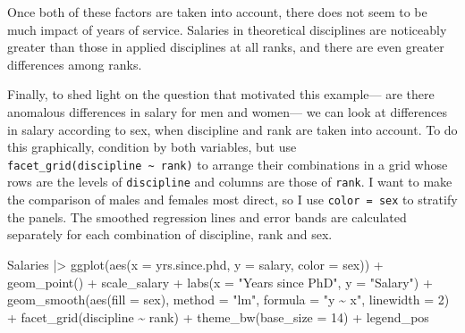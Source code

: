 \documentclass[
  letterpaper,
  10pt,
  krantz2]{krantz}
\makeatletter
\newenvironment{Shaded}{\begin{snugshade}}{\end{snugshade}}
\newcommand{\AttributeTok}[1]{\textcolor[rgb]{0.40,0.45,0.13}{#1}}
\newcommand{\DecValTok}[1]{\textcolor[rgb]{0.68,0.00,0.00}{#1}}
\newcommand{\FunctionTok}[1]{\textcolor[rgb]{0.28,0.35,0.67}{#1}}
\newcommand{\NormalTok}[1]{\textcolor[rgb]{0.00,0.23,0.31}{#1}}
\newcommand{\SpecialCharTok}[1]{\textcolor[rgb]{0.37,0.37,0.37}{#1}}
\newcommand{\StringTok}[1]{\textcolor[rgb]{0.13,0.47,0.30}{#1}}
\newenvironment{kframe}{%
  \medskip{}
  \setlength{\fboxsep}{.8em}
  \def\at@end@of@kframe{}%
  \ifinner\ifhmode%
  \def\at@end@of@kframe{\end{minipage}}%
  \begin{minipage}{\columnwidth}%
  \fi\fi%
  \def\FrameCommand##1{\hskip\@totalleftmargin \hskip-\fboxsep
  \colorbox{shadecolor}{##1}\hskip-\fboxsep
      \hskip-\linewidth \hskip-\@totalleftmargin \hskip\columnwidth}%
  \MakeFramed {\advance\hsize-\width
    \@totalleftmargin\z@ \linewidth\hsize
    \@setminipage}}%
{\par\unskip\endMakeFramed%
  \at@end@of@kframe}
\renewenvironment{Shaded}{\begin{kframe}}{\end{kframe}}
\makeatother
\begin{document}
Once both of these factors are taken into account, there does not seem
to be much impact of years of service. Salaries in theoretical
disciplines are noticeably greater than those in applied disciplines at
all ranks, and there are even greater differences among ranks.

Finally, to shed light on the question that motivated this example---
are there anomalous differences in salary for men and women--- we can
look at differences in salary according to sex, when discipline and rank
are taken into account. To do this graphically, condition by both
variables, but use
\texttt{facet\_grid(discipline\ \textasciitilde{}\ rank)} to arrange
their combinations in a grid whose rows are the levels of
\texttt{discipline} and columns are those of \texttt{rank}. I want to
make the comparison of males and females most direct, so I use
\texttt{color\ =\ sex} to stratify the panels. The smoothed regression
lines and error bands are calculated separately for each combination of
discipline, rank and sex.

\begin{Shaded}
\begin{Highlighting}[]
\NormalTok{Salaries }\SpecialCharTok{|\textgreater{}}
  \FunctionTok{ggplot}\NormalTok{(}\FunctionTok{aes}\NormalTok{(}\AttributeTok{x =}\NormalTok{ yrs.since.phd, }\AttributeTok{y =}\NormalTok{ salary, }\AttributeTok{color =}\NormalTok{ sex)) }\SpecialCharTok{+}
  \FunctionTok{geom\_point}\NormalTok{() }\SpecialCharTok{+}
\NormalTok{  scale\_salary }\SpecialCharTok{+}
  \FunctionTok{labs}\NormalTok{(}\AttributeTok{x =} \StringTok{"Years since PhD"}\NormalTok{,}
       \AttributeTok{y =} \StringTok{"Salary"}\NormalTok{) }\SpecialCharTok{+}
  \FunctionTok{geom\_smooth}\NormalTok{(}\FunctionTok{aes}\NormalTok{(}\AttributeTok{fill =}\NormalTok{ sex),}
              \AttributeTok{method =} \StringTok{"lm"}\NormalTok{, }\AttributeTok{formula =} \StringTok{"y \textasciitilde{} x"}\NormalTok{,}
              \AttributeTok{linewidth =} \DecValTok{2}\NormalTok{) }\SpecialCharTok{+}
  \FunctionTok{facet\_grid}\NormalTok{(discipline }\SpecialCharTok{\textasciitilde{}}\NormalTok{ rank) }\SpecialCharTok{+}
  \FunctionTok{theme\_bw}\NormalTok{(}\AttributeTok{base\_size =} \DecValTok{14}\NormalTok{) }\SpecialCharTok{+} 
\NormalTok{  legend\_pos}
\end{Highlighting}
\end{Shaded}
\end{document}
